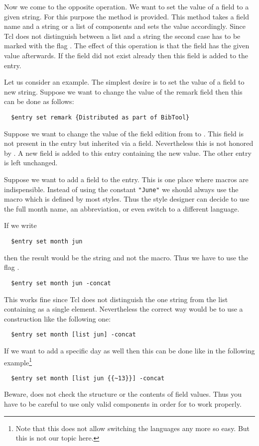 Now we come to the opposite operation. We want to set the value of a
field to a given string.  For this purpose the method  is provided. This method takes a field name and a string or a list
of components and sets the value accordingly. Since Tcl does not
distinguish between a list and a string the second case has to be
marked with the flag . The effect of this operation is
that the field has the given value afterwards. If the field did not
exist already then this field is added to the entry.

Let us consider an example. The simplest desire is to set the value of
a field to new string. Suppose we want to change the value of the
remark field then this can be done as follows:
\begin{verbatim}
  $entry set remark {Distributed as part of BibTool}
\end{verbatim}%
Suppose we want to change the value of the field edition from
 to . This field is not present in the entry
but inherited via a  field. Nevertheless this is not
honored by . A new field is added to this entry
containing the new value. The other entry is left unchanged.

Suppose we want to add a field  to the entry. This is one
place where \BibTeX{} macros are indispensible. Instead of using the
constant \verb|"June"| we should always use the macro  which
is defined by most \BibTeX{} styles. Thus the \BibTeX{} style designer
can decide to use the full month name, an abbreviation, or even switch
to a different language.

If we write
\begin{verbatim}
  $entry set month jun
\end{verbatim}%
\noindent
then the result would be the string  and not the \BibTeX{}
macro. Thus we have to use the flag .
\begin{verbatim}
  $entry set month jun -concat
\end{verbatim}%
This works fine since Tcl does not distinguish the one string
 from the list containing  as a single element.
Nevertheless the correct way would be to use a construction like the
following one:
\begin{verbatim}
  $entry set month [list jun] -concat
\end{verbatim}%
If we want to add a specific day as well then this can be done like in
the following example\footnote{Note that this does not allow switching
the languages any more so easy. But this is not our topic here.}
\begin{verbatim}
  $entry set month [list jun {{~13}}] -concat
\end{verbatim}%
Beware, \BibTool{} does not check the structure or the contents of
field values. Thus you have to be careful to use only valid components
in order for \BibTeX{} to work properly.

